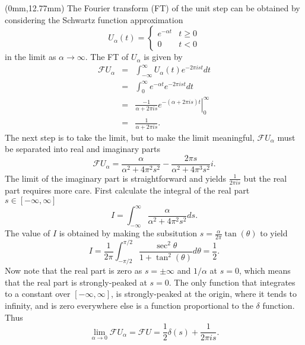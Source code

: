 \begin{textblock*}{75mm}(0mm,12.77mm)
The Fourier transform (FT) of the unit step can be obtained by considering
the Schwartz function approximation
\begin{equation}
  U_{\alpha}(t) = \left\{ \begin{array}{cc} e^{-\alpha t} & t \geq 0 \\ 0 & t < 0 \end{array} \right.  
\end{equation}
in the limit as $\alpha \rightarrow \infty$.
The FT of $U_{\alpha}$ is given by
\begin{eqnarray}
{\mathcal F} U_{\alpha} & = & \int_{-\infty}^{\infty} U_{\alpha}(t) e^{-2 \pi i s t} dt \\ \nonumber
                        & = & \int_{0}^{\infty} e^{-\alpha t} e^{-2 \pi i s t} dt \\ \nonumber
                        & = & \left. \frac{-1}{\alpha + 2 \pi i s} e^{-(\alpha + 2 \pi i s) t}  \right|_{0}^{\infty} \\ \nonumber
                        & = & \frac{1}{\alpha + 2 \pi i s}.
\end{eqnarray}
The next step is to take the limit, but to make the limit meaningful, ${\mathcal F}U_{\alpha}$ must
be separated into real and imaginary parts
\begin{equation}
  {\mathcal F} U_{\alpha} = \frac{\alpha}{\alpha^2 + 4 \pi^2 s^2} - \frac{2 \pi s}{\alpha^2 + 4 \pi^3 s^2} i.
\end{equation}
The limit of the imaginary part is straightforward and yields $\frac{1}{2 \pi i s}$ but the real
part requires more care.  First calculate the integral of the real part $s \in [-\infty,\infty]$
\begin{equation}
I =  \int_{-\infty}^{\infty} \frac{\alpha}{\alpha^2 + 4 \pi^2 s^2} ds .
\end{equation}
The value of $I$ is obtained by making the subsitution $s = \frac{\alpha}{2 \pi} \tan(\theta)$ to yield
\[
  I = \frac{1}{2 \pi} \int_{-\pi/2}^{\pi/2} \frac{ \sec^2{\theta} }{1 + \tan^2(\theta)} d \theta = \frac{1}{2} .
\]
Now note that the real part is zero as $s = \pm \infty$ and $1/\alpha$ at $s=0$, which means that the real part
is strongly-peaked at $s=0$.  The only function that integrates to a constant over $[-\infty,\infty]$, is 
strongly-peaked at the origin, where it tends to infinity, and is zero everywhere else is a function
proportional to the $\delta$ function.  Thus
\begin{equation}
 \lim_{\alpha \rightarrow 0} {\mathcal F} U_{\alpha} = {\mathcal F}U = \frac{1}{2} \delta(s) + \frac{1}{2 \pi i s} .
\end{equation}
\end{textblock*}




\newpage